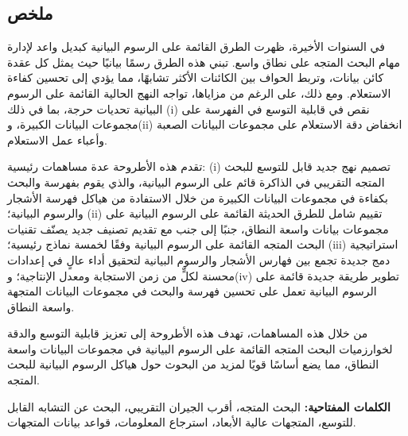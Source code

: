 \documentclass[12pt]{thesis}
\newenvironment{abstractarabic}{
    \selectlanguage{arabic}
    \chapter*{\textarabic{ملخص}}
}{
}
\begin{document}
\begin{preliminary}
\begin{abstractarabic}
في السنوات الأخيرة، ظهرت الطرق القائمة على الرسوم البيانية كبديل واعد لإدارة مهام البحث المتجه على نطاق واسع. تبني هذه الطرق رسمًا بيانيًا حيث يمثل كل عقدة كائن بيانات، وتربط الحواف بين الكائنات الأكثر تشابهًا، مما يؤدي إلى تحسين كفاءة الاستعلام. ومع ذلك، على الرغم من مزاياها، تواجه النهج الحالية القائمة على الرسوم البيانية تحديات حرجة، بما في ذلك (i) نقص في قابلية التوسع في الفهرسة على مجموعات البيانات الكبيرة، و(ii) انخفاض دقة الاستعلام على مجموعات البيانات الصعبة وأعباء عمل الاستعلام.

تقدم هذه الأطروحة عدة مساهمات رئيسية: (i) تصميم نهج جديد قابل للتوسع للبحث المتجه التقريبي في الذاكرة قائم على الرسوم البيانية، والذي يقوم بفهرسة والبحث بكفاءة في مجموعات البيانات الكبيرة من خلال الاستفادة من هياكل فهرسة الأشجار والرسوم البيانية؛ (ii) تقييم شامل للطرق الحديثة القائمة على الرسوم البيانية على مجموعات بيانات واسعة النطاق، جنبًا إلى جنب مع تقديم تصنيف جديد يصنّف تقنيات البحث المتجه القائمة على الرسوم البيانية وفقًا لخمسة نماذج رئيسية؛ (iii) استراتيجية دمج جديدة تجمع بين فهارس الأشجار والرسوم البيانية لتحقيق أداء عالٍ في إعدادات محسنة لكلٍّ من زمن الاستجابة ومعدل الإنتاجية؛ و(iv) تطوير طريقة جديدة قائمة على الرسوم البيانية تعمل على تحسين فهرسة والبحث في مجموعات البيانات المتجهة واسعة النطاق.

من خلال هذه المساهمات، تهدف هذه الأطروحة إلى تعزيز قابلية التوسع والدقة لخوارزميات البحث المتجه القائمة على الرسوم البيانية في مجموعات البيانات واسعة النطاق، مما يضع أساسًا قويًا لمزيد من البحوث حول هياكل الرسوم البيانية للبحث المتجه.

\textbf{الكلمات المفتاحية:} البحث المتجه، أقرب الجيران التقريبي، البحث عن التشابه القابل للتوسع، المتجهات عالية الأبعاد، استرجاع المعلومات، قواعد بيانات المتجهات.
\end{abstractarabic}


	




\tableofcontents

\end{preliminary}


\listoffigures
\listoftables










  


%
\end{document}
